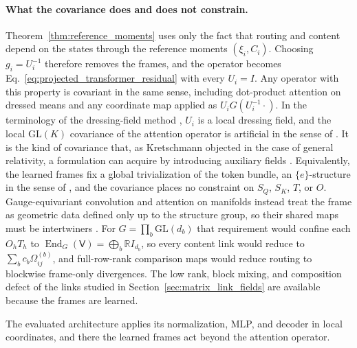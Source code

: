 \documentclass[twoside,11pt]{article}
\begin{document}
\paragraph{What the covariance does and does not constrain.}
Theorem~\ref{thm:reference_moments} uses only the fact that routing and content depend on the states through the reference moments $(\xi_i,C_i)$. Choosing $g_i=U_i^{-1}$ therefore removes the frames, and the operator becomes Eq.~\eqref{eq:projected_transformer_residual} with every $U_i=I$. Any operator with this property is covariant in the same sense, including dot-product attention on dressed means and any coordinate map applied as $U_iG(U_i^{-1}\cdot)$. In the terminology of the dressing-field method \citep{Fournel2014Dressing}, $U_i$ is a local dressing field, and the local $\mathrm{GL}(K)$ covariance of the attention operator is artificial in the sense of \citet[Sec.~2.2]{Francois2019Artificial}. It is the kind of covariance that, as Kretschmann objected in the case of general relativity, a formulation can acquire by introducing auxiliary fields \citep{Norton1993}. Equivalently, the learned frames fix a global trivialization of the token bundle, an $\{e\}$-structure in the sense of \citet[Sec.~2.1.1]{weiler2021coordinate}, and the covariance places no constraint on $S_Q$, $S_K$, $T$, or $O$. Gauge-equivariant convolution and attention on manifolds instead treat the frame as geometric data defined only up to the structure group, so their shared maps must be intertwiners \citetext{\citealp[Sec.~2.4]{cohen2019gauge}; \citealp[Secs.~4.3 and~4.4]{He2021GaugeEquivariantTransformer}}. For $G=\prod_b\mathrm{GL}(d_b)$ that requirement would confine each $O_hT_h$ to $\operatorname{End}_G(\mathsf V)=\bigoplus_b\mathbb RI_{d_b}$, so every content link would reduce to $\sum_bc_b\Omega_{ij}^{(b)}$, and full-row-rank comparison maps would reduce routing to blockwise frame-only divergences. The low rank, block mixing, and composition defect of the links studied in Section~\ref{sec:matrix_link_fields} are available because the frames are learned.

The evaluated architecture applies its normalization, MLP, and decoder in local coordinates, and there the learned frames act beyond the attention operator.
\end{document}
